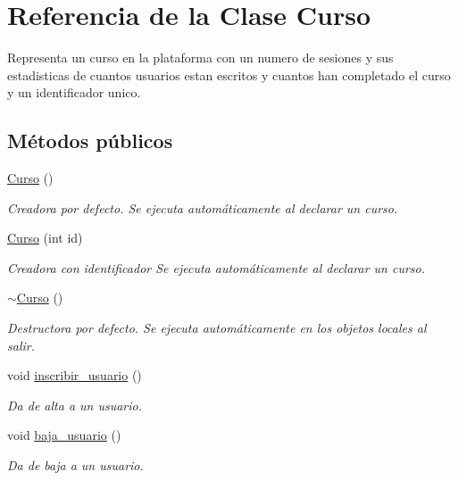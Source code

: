 \hypertarget{class_curso}{}\section{Referencia de la Clase Curso}
\label{class_curso}


Representa un curso en la plataforma con un numero de sesiones y sus estadisticas de cuantos usuarios estan escritos y cuantos han completado el curso y un identificador unico.  


\subsection*{Métodos públicos}
\begin{DoxyCompactItemize}
\item 
\mbox{\hyperlink{class_curso_add3bcc7fd065fa02b8fad76cedcc3a8a}{Curso}} ()
\begin{DoxyCompactList}\small\item\em Creadora por defecto. Se ejecuta automáticamente al declarar un curso. \end{DoxyCompactList}\item 
\mbox{\hyperlink{class_curso_a88bafa52e2ad615cedc04918453ff59c}{Curso}} (int id)
\begin{DoxyCompactList}\small\item\em Creadora con identificador Se ejecuta automáticamente al declarar un curso. \end{DoxyCompactList}\item 
\mbox{\hyperlink{class_curso_af81ae2c50caea1382d28441859ca1eb5}{$\sim$\+Curso}} ()
\begin{DoxyCompactList}\small\item\em Destructora por defecto. Se ejecuta automáticamente en los objetos locales al salir. \end{DoxyCompactList}\item 
void \mbox{\hyperlink{class_curso_a7b4f00ccb63ad80befcd77500e15c939}{inscribir\+\_\+usuario}} ()
\begin{DoxyCompactList}\small\item\em Da de alta a un usuario. \end{DoxyCompactList}\item 
void \mbox{\hyperlink{class_curso_a6c279cf46fc2df8e8f1c8ae93cdffec9}{baja\+\_\+usuario}} ()
\begin{DoxyCompactList}\small\item\em Da de baja a un usuario. \end{DoxyCompactList}\item 

\end{DoxyCompactItemize}
